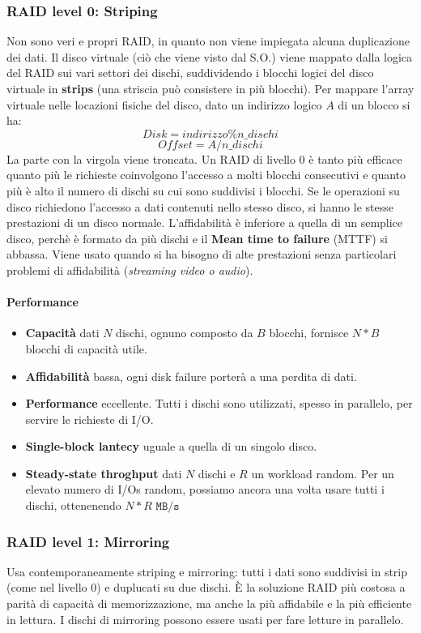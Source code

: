 \documentclass[12pt, letterpaper]{article}
\begin{document}
			\subsubsection{RAID level 0: Striping}
				Non sono veri e propri RAID, in quanto non viene impiegata alcuna duplicazione dei dati. Il disco virtuale (ciò che viene visto dal S.O.) viene mappato dalla logica del RAID sui vari settori dei dischi, suddividendo i blocchi logici del disco virtuale in \textbf{strips} (una striscia può consistere in più blocchi). Per mappare l'array virtuale nelle locazioni fisiche del disco, dato un indirizzo logico $A$ di un blocco si ha:
				$$Disk = indirizzo \% n\_dischi$$ 
				$$Offset = A / n\_dischi $$
				La parte con la virgola viene troncata. Un RAID di livello 0 è tanto più efficace quanto più le richieste coinvolgono l'accesso a molti blocchi consecutivi e quanto più è alto il numero di dischi su cui sono suddivisi i blocchi. Se le operazioni su disco richiedono l'accesso a dati contenuti nello stesso disco, si hanno le stesse prestazioni di un disco normale. L'affidabilità è inferiore a quella di un semplice disco, perchè è formato da più dischi e il \textbf{Mean time to failure} (MTTF) si abbassa. Viene usato quando si ha bisogno di alte prestazioni senza particolari problemi di affidabilità (\textit{streaming video o audio}).
				
				\paragraph{Performance}
					\begin{itemize}
						\item \textbf{Capacità} dati $N$ dischi, ognuno composto da $B$ blocchi, fornisce $N * B$ blocchi di capacità utile.
						\item \textbf{Affidabilità} bassa, ogni disk failure porterà a una perdita di dati.
						\item \textbf{Performance} eccellente. Tutti i dischi sono utilizzati, spesso in parallelo, per servire le richieste di I/O.
						\item \textbf{Single-block lantecy} uguale a quella di un singolo disco.
						\item \textbf{Steady-state throghput} dati $N$ dischi e $R$ un workload random. Per un elevato numero di I/Os random, possiamo ancora una volta usare tutti i dischi, ottenenendo $N * R \texttt{ MB/s}$ 
					\end{itemize}
					
			\subsubsection{RAID level 1: Mirroring}
				Usa contemporaneamente striping e mirroring: tutti i dati sono suddivisi in strip (come nel livello 0) e duplucati su due dischi. È la soluzione RAID più costosa a parità di capacità di memorizzazione, ma anche la più affidabile e la più efficiente in lettura. I dischi di mirroring possono essere usati per fare letture in parallelo. 
				
\end{document}

